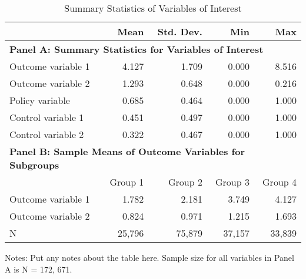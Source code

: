 \documentclass[12pt,english]{article}
\begin{document}
\begin{table}[htbp]
  \centering
  \begin{threeparttable}
    \caption{Summary Statistics of Variables of Interest}
    \label{tab:summary}
    \begin{tabular}{lrrrr}
      \toprule
      & Mean & Std. Dev. & Min & Max \\
      \midrule
      \multicolumn{5}{l}{\textbf{Panel A: Summary Statistics for Variables of Interest}} \\
      Outcome variable 1 & 4.127 & 1.709 & 0.000 & 8.516 \\
      Outcome variable 2 & 1.293 & 0.648 & 0.000 & 0.216 \\
      Policy variable & 0.685 & 0.464 & 0.000 & 1.000 \\
      Control variable 1 & 0.451 & 0.497 & 0.000 & 1.000 \\
      Control variable 2 & 0.322 & 0.467 & 0.000 & 1.000 \\
      \midrule
      \multicolumn{5}{l}{\textbf{Panel B: Sample Means of Outcome Variables for Subgroups}} \\
      & Group 1 & Group 2 & Group 3 & Group 4 \\
      \cmidrule(lr){2-5}
      Outcome variable 1 & 1.782 & 2.181 & 3.749 & 4.127 \\
      Outcome variable 2 & 0.824 & 0.971 & 1.215 & 1.693 \\
      N & 25,796 & 75,879 & 37,157 & 33,839 \\
      \bottomrule
    \end{tabular}
    \begin{tablenotes}
      \small
      \item Notes: Put any notes about the table here. Sample size for all variables in Panel A is N = 172, 671.
    \end{tablenotes}
  \end{threeparttable}
\end{table}
\end{document}
